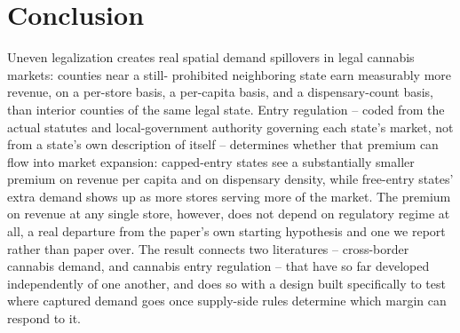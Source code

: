 \documentclass[12pt]{article}
\begin{document}
\section{Conclusion}
\label{sec:conclusion}

Uneven legalization creates real spatial demand spillovers in legal cannabis markets: counties near a still-
prohibited neighboring state earn measurably more revenue, on a per-store basis, a per-capita basis, and a
dispensary-count basis, than interior counties of the same legal state. Entry regulation -- coded from the
actual statutes and local-government authority governing each state's market, not from a state's own
description of itself -- determines whether that premium can flow into market expansion: capped-entry states
see a substantially smaller premium on revenue per capita and on dispensary density, while free-entry states'
extra demand shows up as more stores serving more of the market. The premium on revenue at any single store,
however, does not depend on regulatory regime at all, a real departure from the paper's own starting
hypothesis and one we report rather than paper over. The result connects two literatures -- cross-border
cannabis demand, and cannabis entry regulation -- that have so far developed independently of one another, and
does so with a design built specifically to test where captured demand goes once supply-side rules determine
which margin can respond to it.



\end{document}
